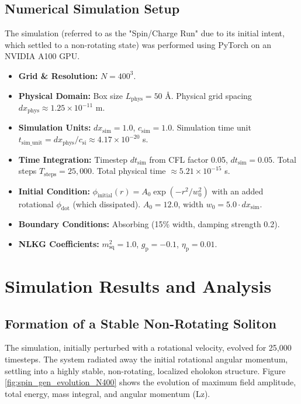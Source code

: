 \documentclass[11pt]{article}
\begin{document}
\subsection{Numerical Simulation Setup}
The simulation (referred to as the "Spin/Charge Run" due to its initial intent, which settled to a non-rotating state) was performed using PyTorch on an NVIDIA A100 GPU.
\begin{itemize}
    \item \textbf{Grid \& Resolution:} \(N=400^3\).
    \item \textbf{Physical Domain:} Box size \(L_{\text{phys}} = 50\) Å. Physical grid spacing \(dx_{\text{phys}} \approx 1.25 \times 10^{-11}\) m.
    \item \textbf{Simulation Units:} \(dx_{\text{sim}} = 1.0\), \(c_{\text{sim}} = 1.0\). Simulation time unit \(t_{\text{sim\_unit}} = dx_{\text{phys}}/c_{\text{si}} \approx 4.17 \times 10^{-20}\) s.
    \item \textbf{Time Integration:} Timestep \(dt_{\text{sim}}\) from CFL factor 0.05, \(dt_{\text{sim}} = 0.05\). Total steps \(T_{\text{steps}} = 25,000\). Total physical time \(\approx 5.21 \times 10^{-15}\) s.
    \item \textbf{Initial Condition:} \(\phi_{\text{initial}}(r) = A_0 \exp(-r^2/w_0^2)\) with an added rotational \(\phi_{\text{dot}}\) (which dissipated). \(A_0 = 12.0\), width \(w_0 = 5.0 \cdot dx_{\text{sim}}\).
    \item \textbf{Boundary Conditions:} Absorbing (15\% width, damping strength 0.2).
    \item \textbf{NLKG Coefficients:} \(m_{\text{sq}}^2 = 1.0\), \(g_{\text{p}} = -0.1\), \(\eta_{\text{p}} = 0.01\).
\end{itemize}

\section{Simulation Results and Analysis}

\subsection{Formation of a Stable Non-Rotating Soliton}
The simulation, initially perturbed with a rotational velocity, evolved for 25,000 timesteps. The system radiated away the initial rotational angular momentum, settling into a highly stable, non-rotating, localized eholokon structure. Figure \ref{fig:spin_gen_evolution_N400} shows the evolution of maximum field amplitude, total energy, mass integral, and angular momentum (Lz).
\end{document}
